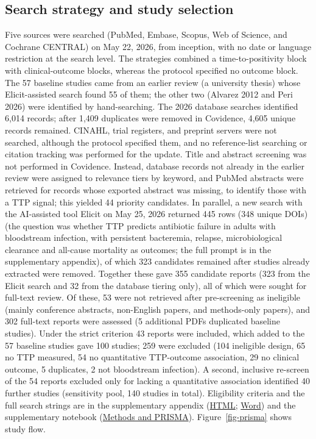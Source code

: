\documentclass[
  11pt,
]{article}
\begin{document}
\subsection{Search strategy and study
selection}\label{search-strategy-and-study-selection}

Five sources were searched (PubMed, Embase, Scopus, Web of Science, and
Cochrane CENTRAL) on May 22, 2026, from inception, with no date or
language restriction at the search level. The strategies combined a
time-to-positivity block with clinical-outcome blocks, whereas the
protocol specified no outcome block. The 57 baseline studies came from
an earlier review (a university thesis) whose Elicit-assisted search
found 55 of them; the other two (Alvarez 2012 and Peri 2026) were
identified by hand-searching. The 2026 database searches identified
6,014 records; after 1,409 duplicates were removed in Covidence, 4,605
unique records remained. CINAHL, trial registers, and preprint servers
were not searched, although the protocol specified them, and no
reference-list searching or citation tracking was performed for the
update. Title and abstract screening was not performed in Covidence.
Instead, database records not already in the earlier review were
assigned to relevance tiers by keyword, and PubMed abstracts were
retrieved for records whose exported abstract was missing, to identify
those with a TTP signal; this yielded 44 priority candidates. In
parallel, a new search with the AI-assisted tool Elicit on May 25, 2026
returned 445 rows (348 unique DOIs) (the question was whether TTP
predicts antibiotic failure in adults with bloodstream infection, with
persistent bacteremia, relapse, microbiological clearance and all-cause
mortality as outcomes; the full prompt is in the supplementary
appendix), of which 323 candidates remained after studies already
extracted were removed. Together these gave 355 candidate reports (323
from the Elicit search and 32 from the database tiering only), all of
which were sought for full-text review. Of these, 53 were not retrieved
after pre-screening as ineligible (mainly conference abstracts,
non-English papers, and methods-only papers), and 302 full-text reports
were assessed (5 additional PDFs duplicated baseline studies). Under the
strict criterion 43 reports were included, which added to the 57
baseline studies gave 100 studies; 259 were excluded (104 ineligible
design, 65 no TTP measured, 54 no quantitative TTP-outcome association,
29 no clinical outcome, 5 duplicates, 2 not bloodstream infection). A
second, inclusive re-screen of the 54 reports excluded only for lacking
a quantitative association identified 40 further studies (sensitivity
pool, 140 studies in total). Eligibility criteria and the full search
strings are in the supplementary appendix
(\href{appendix-preview.html}{HTML};
\href{downloads/appendix.docx}{Word}) and the supplementary notebook
(\href{notebooks/methods.qmd}{Methods and PRISMA}).
Figure~\ref{fig-prisma} shows study flow.
\end{document}
